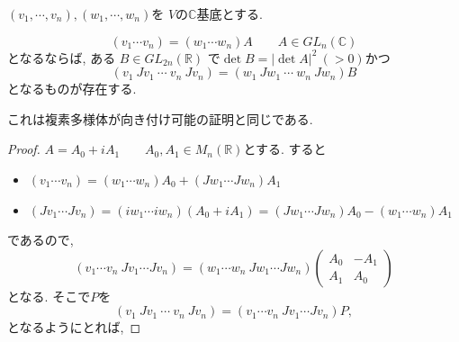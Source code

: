 \begin{tcolorbox}[mybox]
\begin{lem}
\label{lem-M-4.3.3}
\((v_{1},\cdots,v_{n}), (w_{1},\cdots,w_{n})\)を
$V$の\(\mathbb{C}\)基底とする. 

\[
(v_{1}\cdots v_{n})=(w_{1}\cdots w_{n})A \qquad A\in GL_{n}(\mathbb{C})
\]
となるならば, ある \(B\in GL_{2n}(\mathbb{R})\) で\( \det B=|\det A|^{2}\ (>0)\)かつ
\[
(v_{1}\ Jv_{1}\ \cdots\ v_{n}\ Jv_{n})=(w_{1}\ Jw_{1}\ \cdots\ w_{n}\ Jw_{n})B
\]
となるものが存在する. 
\end{lem}
\end{tcolorbox}
これは複素多様体が向き付け可能の証明と同じである. 
\begin{proof}
\(
A=A_{0}+iA_{1} \qquad A_{0},A_{1}\in M_{n}(\mathbb{R})
\)とする. 
すると
\begin{itemize}
\item $ (v_{1}\cdots v_{n})=(w_{1}\cdots w_{n})A_{0}+(Jw_{1}\cdots Jw_{n})A_{1}$
\item $(Jv_{1}\cdots Jv_{n})
=(iw_{1}\cdots iw_{n})(A_{0}+iA_{1})
=(Jw_{1}\cdots Jw_{n})A_{0}-(w_{1}\cdots w_{n})A_{1}$
\end{itemize}
であるので, 
\[
(v_{1}\cdots v_{n}\ Jv_{1}\cdots Jv_{n})
=
(w_{1}\cdots w_{n}\ Jw_{1}\cdots Jw_{n})
\begin{pmatrix}
A_{0} & -A_{1} \\
A_{1} & A_{0}
\end{pmatrix}
\]
となる. そこで$P$を
\[
(v_{1}\ Jv_{1}\ \cdots\ v_{n}\ Jv_{n})=(v_{1}\cdots v_{n}\ Jv_{1}\cdots Jv_{n})P,
\]
となるようにとれば,


\end{proof}
